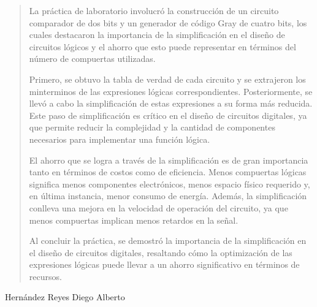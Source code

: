 \documentclass[a4paper,12pt]{article}
\begin{document}
\begin{quotation}
	La práctica de laboratorio involucró la construcción de un circuito comparador de dos bits y un generador de código Gray de cuatro bits, los cuales destacaron la importancia de la simplificación en el diseño de circuitos lógicos y el ahorro que esto puede representar en términos del número de compuertas utilizadas. \par

	Primero, se obtuvo la tabla de verdad de cada circuito y se extrajeron los minterminos de las expresiones lógicas correspondientes. Posteriormente, se llevó a cabo la simplificación de estas expresiones a su forma más reducida. Este paso de simplificación es crítico en el diseño de circuitos digitales, ya que permite reducir la complejidad y la cantidad de componentes necesarios para implementar una función lógica.\par

	El ahorro que se logra a través de la simplificación es de gran importancia tanto en términos de costos como de eficiencia. Menos compuertas lógicas significa menos componentes electrónicos, menos espacio físico requerido y, en última instancia, menor consumo de energía. Además, la simplificación conlleva una mejora en la velocidad de operación del circuito, ya que menos compuertas implican menos retardos en la señal.\par

	Al concluir la práctica, se demostró la importancia de la simplificación en el diseño de circuitos digitales, resaltando cómo la optimización de las expresiones lógicas puede llevar a un ahorro significativo en términos de recursos.\par
\end{quotation}

\vspace{1cm}

Hernández Reyes Diego Alberto
\end{document}
